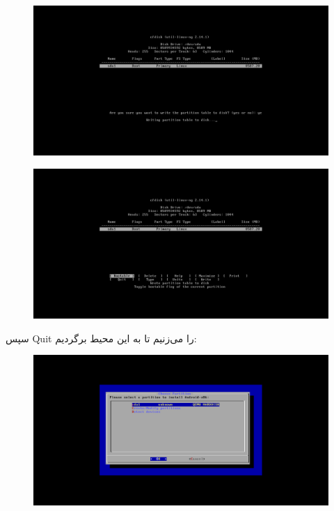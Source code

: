 \documentclass{article}
\begin{document}
\begin{figure}[ht]
	\centering	
	\includegraphics[width = 1\textwidth]{images/install8.png}
\end{figure}

\newpage

\begin{figure}[ht]
	\centering	
	\includegraphics[width = 1\textwidth]{images/install9.png}
\end{figure}

سپس Quit را می‌زنیم تا به این محیط برگردیم:

\begin{figure}[ht]
	\centering	
	\includegraphics[width = 1\textwidth]{images/install10.png}
\end{figure}
\end{document}
